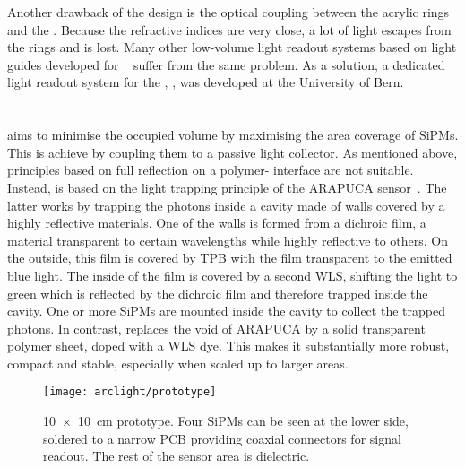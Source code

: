 Another drawback of the design is the optical coupling between the acrylic rings and the \lar{}.
Because the refractive indices are very close, a lot of light escapes from the rings and is lost.
Many other low-volume light readout systems based on light guides developed for \lar{}~\cite{lar_lro1, lar_lro2, lar_lro3, lar_lro4, lar_lro5, lar_lro6, lar_lro7} suffer from the same problem.
As a solution, a dedicated light readout system for the \AC{}, \AL{}, was developed at the University of Bern.


\section{\AL{}}
\label{sec:light-ro_arclight}

\AL{} aims to minimise the occupied volume by maximising the area coverage of SiPMs.
This is achieve by coupling them to a passive light collector.
As mentioned above, principles based on full reflection on a polymer-\lar{} interface are not suitable.
Instead, \AL{} is based on the light trapping principle of the ARAPUCA sensor~\cite{arapuca}.
The latter works by trapping the photons inside a cavity made of walls covered by a highly reflective materials.
One of the walls is formed from a dichroic film, a material transparent to certain wavelengths while highly reflective to others.
On the outside, this film is covered by TPB with the film transparent to the emitted blue light.
The inside of the film is covered by a second WLS, shifting the light to green which is reflected by the dichroic film and therefore trapped inside the cavity.
One or more SiPMs are mounted inside the cavity to collect the trapped photons.
In contrast, \AL{} replaces the void of ARAPUCA by a solid transparent polymer sheet, doped with a WLS dye.
This makes it substantially more robust, compact and stable, especially when scaled up to larger areas.

\begin{figure}[htb]
	\centering
	\texttt{[image: arclight/prototype]}
	\caption{\SI{10 x 10}{\centi\metre} \AL{} prototype.
		Four SiPMs can be seen at the lower side, soldered to a narrow PCB providing coaxial connectors for signal readout.
		The rest of the sensor area is dielectric.}
	\label{fig:arclight_prototype}
\end{figure}

